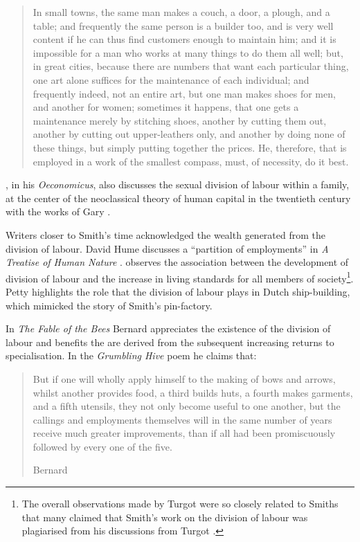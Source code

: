 \begin{quote}
In small towns, the same man makes a couch, a door, a plough, and a table; and frequently the same person is a builder too, and is very well content if he can thus find customers enough to maintain him; and it is impossible for a man who works at many things to do them all well; but, in great cities, because there are numbers that want each particular thing, one art alone suffices for the maintenance of each individual; and frequently indeed, not an entire art, but one man makes shoes for men, and another for women; sometimes it happens, that one gets a maintenance merely by stitching shoes, another by cutting them out, another by cutting out upper-leathers only, and another by doing none of these things, but simply putting together the prices. He, therefore, that is employed in a work of the smallest compass, must, of necessity, do it best.

\begin{flushright}
\citet[p.~244]{Xenophon1886}
\end{flushright}
\end{quote}

\citet{Xenophon1994}, in his \emph{Oeconomicus}, also discusses the sexual division of labour within a family, at the center of the neoclassical theory of human capital in the twentieth century with the works of Gary \citet{Becker1985}.

\medskip \noindent Writers closer to Smith's time acknowledged the wealth generated from the division of labour. David Hume discusses a ``partition of employments'' in \emph{A Treatise of Human Nature} \citep{Hume1740}. \citet{Turgot1774} observes the association between the development of division of labour and the increase in living standards for all members of society\footnote{The overall observations made by Turgot were so closely related to Smiths that many claimed that Smith's work on the division of labour was plagiarised from his discussions from Turgot \citep{YangNg1998}.}. Petty highlights the role that the division of labour plays in Dutch ship-building, which mimicked the story of Smith's pin-factory.

In \emph{The Fable of the Bees} Bernard \citet{Mandeville1795} appreciates the existence of the division of labour and benefits the are derived from the subsequent increasing returns to specialisation. In the \emph{Grumbling Hive} poem he claims that:

\begin{quote}
But if one will wholly apply himself to the making of bows and arrows, whilst another provides food, a third builds huts, a fourth makes garments, and a fifth utensils, they not only become useful to one another, but the callings and employments themselves will in the same number of years receive much greater improvements, than if all had been promiscuously followed by every one of the five.

\begin{flushright}
Bernard \citet[p.~465]{Mandeville1795}
\end{flushright}
\end{quote}

